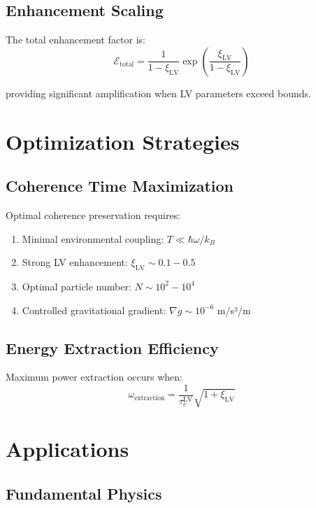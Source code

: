 \documentclass[11pt]{article}
\begin{document}
\subsection{Enhancement Scaling}

The total enhancement factor is:
\begin{equation}
\mathcal{E}_{\text{total}} = \frac{1}{1 - \xi_{\text{LV}}} \exp\left(\frac{\xi_{\text{LV}}}{1 - \xi_{\text{LV}}}\right)
\end{equation}

providing significant amplification when LV parameters exceed bounds.

\section{Optimization Strategies}

\subsection{Coherence Time Maximization}

Optimal coherence preservation requires:
\begin{enumerate}
\item Minimal environmental coupling: $T \ll \hbar\omega/k_B$
\item Strong LV enhancement: $\xi_{\text{LV}} \sim 0.1-0.5$
\item Optimal particle number: $N \sim 10^2-10^4$
\item Controlled gravitational gradient: $\nabla g \sim 10^{-6}$ m/s²/m
\end{enumerate}

\subsection{Energy Extraction Efficiency}

Maximum power extraction occurs when:
\begin{equation}
\omega_{\text{extraction}} = \frac{1}{\tau_c^{\text{LV}}} \sqrt{1 + \xi_{\text{LV}}}
\end{equation}

\section{Applications}

\subsection{Fundamental Physics}
\end{document}
